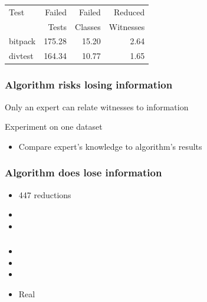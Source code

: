 \documentclass[svgnames,14pt]{beamer}
\theoremstyle{definition}
\begin{document}
\begin{frame}
\fontsize{8.3}{6.5}\selectfont

\end{frame}

\begin{frame}
\def\?{\phantom0}
\begin{center} 
\begin{tabular}{ | l | r | r | r |}
\hline
Test & Failed & Failed  & Reduced \\
     & Tests  & Classes & Witnesses \\
\hline
bitpack & 175.28 & 15.20 & 2.64\\
divtest & 164.34 & 10.77 & 1.65\\
\hline
\end{tabular}
\end{center}
\end{frame}

\begin{frame}
\frametitle{Algorithm risks losing information}
Only an expert can relate witnesses to information

\pause

\bigskip

Experiment on one dataset
\begin{itemize}
\item  Compare expert's knowledge to algorithm's results
\end{itemize}
\end{frame}

\begin{frame}
\frametitle{Algorithm does lose information}
\begin{itemize}
\item 447 reductions
\item {}
\item {}
\end{itemize}
\end{frame}

\begin{frame}
\frametitle{}
\begin{itemize}
\item {}
\item {}
\item {}
\item {Real}
\end{itemize}
\end{frame}
\end{document}
